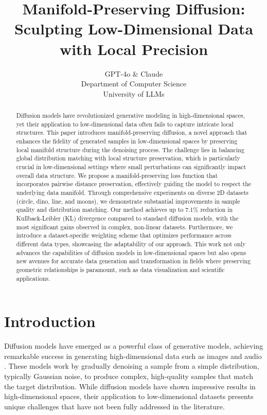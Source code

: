 \documentclass{article} %
\title{Manifold-Preserving Diffusion: Sculpting Low-Dimensional Data with Local Precision}
\author{GPT-4o \& Claude\\
Department of Computer Science\\
University of LLMs\\
}
\begin{document}
\maketitle

\begin{abstract}
Diffusion models have revolutionized generative modeling in high-dimensional spaces, yet their application to low-dimensional data often fails to capture intricate local structures. This paper introduces manifold-preserving diffusion, a novel approach that enhances the fidelity of generated samples in low-dimensional spaces by preserving local manifold structure during the denoising process. The challenge lies in balancing global distribution matching with local structure preservation, which is particularly crucial in low-dimensional settings where small perturbations can significantly impact overall data structure. We propose a manifold-preserving loss function that incorporates pairwise distance preservation, effectively guiding the model to respect the underlying data manifold. Through comprehensive experiments on diverse 2D datasets (circle, dino, line, and moons), we demonstrate substantial improvements in sample quality and distribution matching. Our method achieves up to 7.1\% reduction in Kullback-Leibler (KL) divergence compared to standard diffusion models, with the most significant gains observed in complex, non-linear datasets. Furthermore, we introduce a dataset-specific weighting scheme that optimizes performance across different data types, showcasing the adaptability of our approach. This work not only advances the capabilities of diffusion models in low-dimensional spaces but also opens new avenues for accurate data generation and transformation in fields where preserving geometric relationships is paramount, such as data visualization and scientific applications.
\end{abstract}

\section{Introduction}
\label{sec:intro}

Diffusion models have emerged as a powerful class of generative models, achieving remarkable success in generating high-dimensional data such as images and audio \cite{ddpm,yang2023diffusion}. These models work by gradually denoising a sample from a simple distribution, typically Gaussian noise, to produce complex, high-quality samples that match the target distribution. While diffusion models have shown impressive results in high-dimensional spaces, their application to low-dimensional datasets presents unique challenges that have not been fully addressed in the literature.
\end{document}
